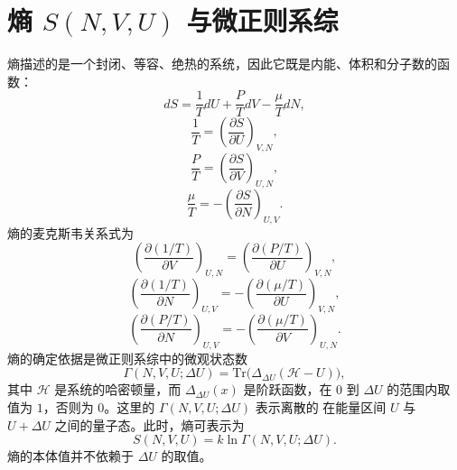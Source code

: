 \section{\texorpdfstring{熵 \(S(N,V,U)\) 与微正则系综}{熵 S(N,V,U) 与微正则系综}}\label{ux71b5-snvu-ux4e0eux5faeux6b63ux5219ux7cfbux7efc}
熵描述的是一个封闭、等容、绝热的系统，因此它既是内能、体积和分子数的函数：
\begin{equation}\tag{17.9.1}\label{eq:17.9.1}
d S = \frac { 1 } { T } d U + \frac { P } { T } d V - \frac { \mu } { T } d N ,
\end{equation}
\begin{equation}\tag{17.9.2}\label{eq:17.9.2}
\frac { 1 } { T }  =  \left( \frac { \partial S } { \partial U } \right) _ { V , N } ,
\end{equation}
\begin{equation}\tag{17.9.3}\label{eq:17.9.3}
\frac { P } { T } = \left( \frac { \partial S } { \partial V } \right) _ { U , N } ,
\end{equation}
\begin{equation}\tag{17.9.4}\label{eq:17.9.4}
\frac { \mu } { T } = - \left( \frac { \partial S } { \partial N } \right) _ { U , V } .
\end{equation}
熵的麦克斯韦关系式为
\begin{equation}\tag{17.9.5}\label{eq:17.9.5}
\left( \frac { \partial ( 1 / T ) } { \partial V } \right) _ { U , N } = \left( \frac { \partial ( P / T ) } { \partial U } \right) _ { V , N } ,
\end{equation}
\begin{equation}\tag{17.9.6}\label{eq:17.9.6}
\left( \frac { \partial ( 1 / T ) } { \partial N } \right) _ { U , V } = - \left( \frac { \partial ( \mu / T ) } { \partial U } \right) _ { V , N } ,
\end{equation}
\begin{equation}\tag{17.9.7}\label{eq:17.9.7}
\left( \frac { \partial ( P / T ) } { \partial N } \right) _ { U , V } = - \left( \frac { \partial ( \mu / T ) } { \partial V } \right) _ { U , N } .
\end{equation}
熵的确定依据是微正则系综中的微观状态数
\begin{equation}\tag{17.9.8}\label{eq:17.9.8}
\Gamma ( N , V , U ; \Delta U ) = \mathrm { T r } \big ( \Delta _ { \Delta U } ( \mathcal { H } - U ) \big ) ,
\end{equation}
其中 \(\mathcal{H}\) 是系统的哈密顿量，而 \(\Delta_{\Delta U}(x)\) 是阶跃函数，在 \(0\) 到 \(\Delta U\) 的范围内取值为 \(1\)，否则为 \(0\)。这里的 \(\Gamma(N,V,U;\Delta U)\) 表示离散的
在能量区间 \(U\) 与 \(U + \Delta U\) 之间的量子态。此时，熵可表示为
\begin{equation}\tag{17.9.9}\label{eq:17.9.9}
S ( N , V , U ) = k \ln \Gamma ( N , V , U ; \Delta U ) .
\end{equation}
熵的本体值并不依赖于 \(\Delta U\) 的取值。
